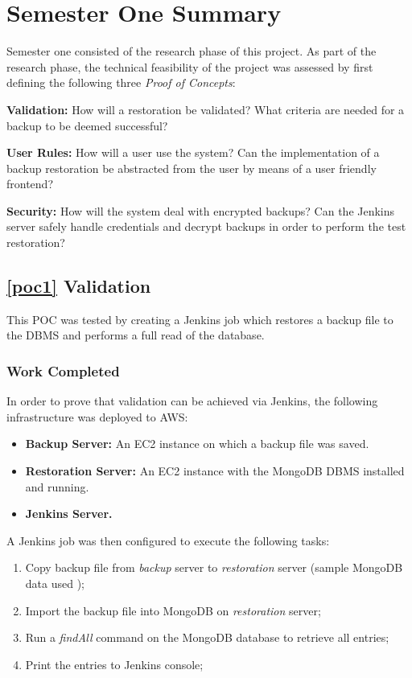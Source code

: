 \section{Semester One Summary}
Semester one consisted of the research phase of this project. As part of the research phase, the technical feasibility of the project was assessed by first defining the following three \textit{Proof of Concepts}:


\begin{POC}
	\item \label{poc1} \textbf{Validation:} How will a restoration be validated? What criteria are needed for a backup to be deemed successful?
	\item \label{poc2} \textbf{User Rules:} How will a user use the system? Can the implementation of a backup restoration be abstracted from the user by means of a user friendly frontend?
	\item \label{poc3} \textbf{Security:} How will the system deal with encrypted backups? Can the Jenkins server safely handle credentials and decrypt backups in order to perform the test restoration?
\end{POC}

\subsection{\ref{poc1} Validation}
  This POC was tested by creating a Jenkins job which restores a backup file to the DBMS and performs a full read of the database.

	\subsubsection{Work Completed}
	In order to prove that validation can be achieved via Jenkins, the following infrastructure was deployed to AWS:
	\begin{itemize}
		\item \textbf{Backup Server:} An EC2 instance on which a backup file was saved.
		\item \textbf{Restoration Server:} An EC2 instance with the MongoDB DBMS installed and running.
		\item \textbf{Jenkins Server.}
	\end{itemize}
	A Jenkins job was then configured to execute the following tasks:
	\begin{enumerate}
		\item Copy backup file from \textit{backup} server to \textit{restoration} server (sample MongoDB data used \citep{mongo});
		\item Import the backup file into MongoDB on \textit{restoration} server;
		\item Run a \textit{findAll} command on the MongoDB database to retrieve all entries;
		\item Print the entries to Jenkins console;
	\end{enumerate}


